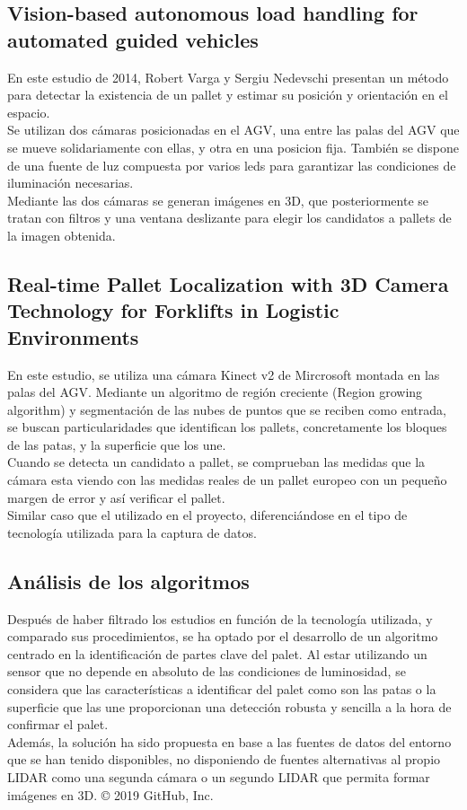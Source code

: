 \subsection{Vision-based autonomous load handling for automated guided vehicles}
En este estudio de 2014, Robert Varga y Sergiu Nedevschi presentan un método para detectar la existencia de un pallet y estimar su posición y orientación en el espacio.\\
Se utilizan dos cámaras posicionadas en el AGV, una entre las palas del AGV que se mueve solidariamente con ellas, y otra en una posicion fija.
También se dispone de una fuente de luz compuesta por varios leds para garantizar las condiciones de iluminación necesarias.\\
Mediante las dos cámaras se generan imágenes en 3D, que posteriormente se tratan con filtros y una ventana deslizante para elegir los candidatos a pallets de la imagen obtenida.


\subsection{Real-time Pallet Localization with 3D Camera Technology for Forklifts in Logistic Environments}
En este estudio, se utiliza una cámara Kinect v2 de Mircrosoft montada en las palas del AGV. Mediante un algoritmo de región creciente (Region growing algorithm) y segmentación de las nubes de puntos que se reciben como entrada, se buscan particularidades que identifican los pallets, concretamente los bloques de las patas, y la superficie que los une. \\ Cuando se detecta un candidato a pallet, se comprueban las medidas que la cámara esta viendo con las medidas reales de un pallet europeo con un pequeño margen de error y así verificar el pallet. \\ Similar caso que el utilizado en el proyecto, diferenciándose en el tipo de tecnología utilizada para la captura de datos.

\subsection{Análisis de los algoritmos}
Después de haber filtrado los estudios en función de la tecnología utilizada, y comparado sus procedimientos, se ha optado por el desarrollo de un algoritmo centrado en la identificación de partes clave del palet. Al estar utilizando un sensor que no depende en absoluto de las condiciones de luminosidad, se considera que las características a identificar del palet como son las patas o la superficie que las une proporcionan una detección robusta y sencilla a la hora de confirmar el palet. \\ Además, la solución ha sido propuesta en base a las fuentes de datos del entorno que se han tenido disponibles, no disponiendo de fuentes alternativas al propio LIDAR como una segunda cámara o un segundo LIDAR que permita formar imágenes en 3D.
© 2019 GitHub, Inc.